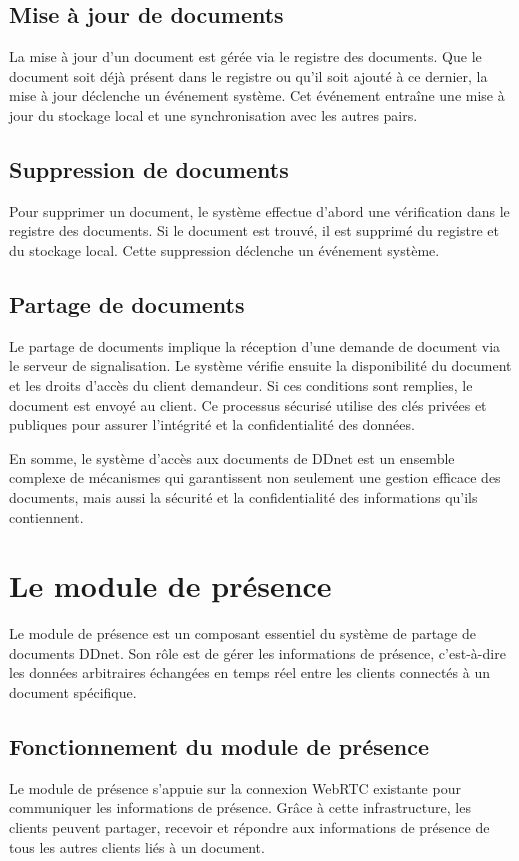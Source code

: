 \subsection{Mise à jour de documents}

La mise à jour d'un document est gérée via le registre des documents. Que le document soit déjà présent dans le registre ou qu'il soit ajouté à ce dernier, la mise à jour déclenche un événement système. Cet événement entraîne une mise à jour du stockage local et une synchronisation avec les autres pairs.

\subsection{Suppression de documents}

Pour supprimer un document, le système effectue d'abord une vérification dans le registre des documents. Si le document est trouvé, il est supprimé du registre et du stockage local. Cette suppression déclenche un événement système.

\subsection{Partage de documents}

Le partage de documents implique la réception d'une demande de document via le serveur de signalisation. Le système vérifie ensuite la disponibilité du document et les droits d'accès du client demandeur. Si ces conditions sont remplies, le document est envoyé au client. Ce processus sécurisé utilise des clés privées et publiques pour assurer l'intégrité et la confidentialité des données.

En somme, le système d'accès aux documents de DDnet est un ensemble complexe de mécanismes qui garantissent non seulement une gestion efficace des documents, mais aussi la sécurité et la confidentialité des informations qu'ils contiennent.

\section{Le module de présence}
Le module de présence est un composant essentiel du système de partage de documents DDnet. Son rôle est de gérer les informations de présence, c'est-à-dire les données arbitraires échangées en temps réel entre les clients connectés à un document spécifique.

\subsection{Fonctionnement du module de présence}
Le module de présence s'appuie sur la connexion WebRTC existante pour communiquer les informations de présence. Grâce à cette infrastructure, les clients peuvent partager, recevoir et répondre aux informations de présence de tous les autres clients liés à un document.

